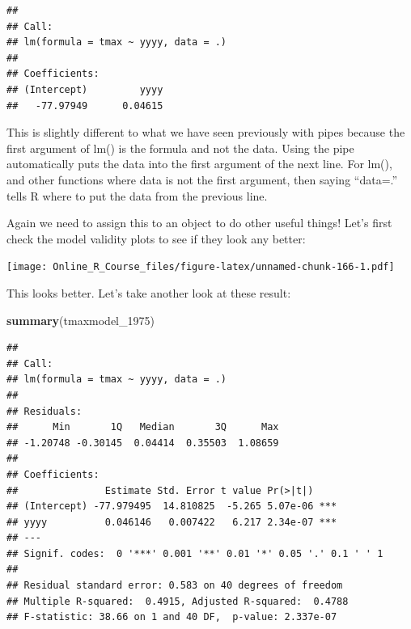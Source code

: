 \documentclass[]{book}
\newenvironment{Shaded}{\begin{snugshade}}{\end{snugshade}}
\newcommand{\DataTypeTok}[1]{\textcolor[rgb]{0.13,0.29,0.53}{#1}}
\newcommand{\DecValTok}[1]{\textcolor[rgb]{0.00,0.00,0.81}{#1}}
\newcommand{\KeywordTok}[1]{\textcolor[rgb]{0.13,0.29,0.53}{\textbf{#1}}}
\newcommand{\NormalTok}[1]{#1}
\newcommand{\OperatorTok}[1]{\textcolor[rgb]{0.81,0.36,0.00}{\textbf{#1}}}
\newcommand{\StringTok}[1]{\textcolor[rgb]{0.31,0.60,0.02}{#1}}
\begin{document}
\begin{verbatim}
## 
## Call:
## lm(formula = tmax ~ yyyy, data = .)
## 
## Coefficients:
## (Intercept)         yyyy  
##   -77.97949      0.04615
\end{verbatim}

This is slightly different to what we have seen previously with pipes because the first argument of lm() is the formula and not the data. Using the pipe automatically puts the data into the first argument of the next line. For lm(), and other functions where data is not the first argument, then saying ``data=.'' tells R where to put the data from the previous line.

Again we need to assign this to an object to do other useful things! Let's first check the model validity plots to see if they look any better:

\begin{Shaded}
\end{Shaded}

\texttt{[image: Online\_R\_Course\_files/figure-latex/unnamed-chunk-166-1.pdf]}

This looks better. Let's take another look at these result:

\begin{Shaded}
\begin{Highlighting}[]
\KeywordTok{summary}\NormalTok{(tmaxmodel_}\DecValTok{1975}\NormalTok{)}
\end{Highlighting}
\end{Shaded}

\begin{verbatim}
## 
## Call:
## lm(formula = tmax ~ yyyy, data = .)
## 
## Residuals:
##      Min       1Q   Median       3Q      Max 
## -1.20748 -0.30145  0.04414  0.35503  1.08659 
## 
## Coefficients:
##               Estimate Std. Error t value Pr(>|t|)    
## (Intercept) -77.979495  14.810825  -5.265 5.07e-06 ***
## yyyy          0.046146   0.007422   6.217 2.34e-07 ***
## ---
## Signif. codes:  0 '***' 0.001 '**' 0.01 '*' 0.05 '.' 0.1 ' ' 1
## 
## Residual standard error: 0.583 on 40 degrees of freedom
## Multiple R-squared:  0.4915, Adjusted R-squared:  0.4788 
## F-statistic: 38.66 on 1 and 40 DF,  p-value: 2.337e-07
\end{verbatim}
\end{document}
